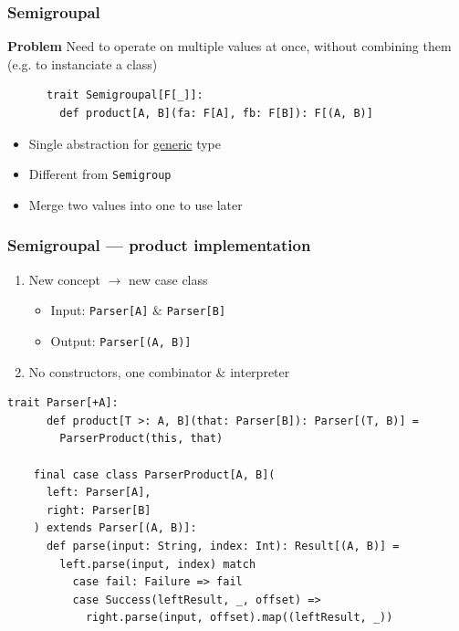 \begin{frame}[fragile]
  \frametitle{Semigroupal}

  \textbf{Problem} Need to operate on multiple values at once, without combining them (e.g. to instanciate a class)

  \begin{definition}[Semigroupal]
    \begin{lstlisting}
      trait Semigroupal[F[_]]:
        def product[A, B](fa: F[A], fb: F[B]): F[(A, B)]
    \end{lstlisting}
  \end{definition}

  \begin{itemize}
    \item Single abstraction for \ul{generic} type
    \item Different from \texttt{Semigroup}
    \item Merge two values into one to use later
  \end{itemize}
\end{frame}

\begin{frame}[fragile]
  \frametitle{Semigroupal --- product implementation}

  \begin{enumerate}
    \item New concept \({\rightarrow}\) new case class
          \begin{itemize}
            \item Input: \texttt{Parser[A]} \& \texttt{Parser[B]}
            \item Output: \texttt{Parser[(A, B)]}
          \end{itemize}
    \item No constructors, one combinator \& interpreter
  \end{enumerate}

  \begin{lstlisting}[gobble=4]
    trait Parser[+A]:
      def product[T >: A, B](that: Parser[B]): Parser[(T, B)] =
        ParserProduct(this, that)

    final case class ParserProduct[A, B](
      left: Parser[A],
      right: Parser[B]
    ) extends Parser[(A, B)]:
      def parse(input: String, index: Int): Result[(A, B)] =
        left.parse(input, index) match
          case fail: Failure => fail
          case Success(leftResult, _, offset) =>
            right.parse(input, offset).map((leftResult, _))
  \end{lstlisting}
\end{frame}

